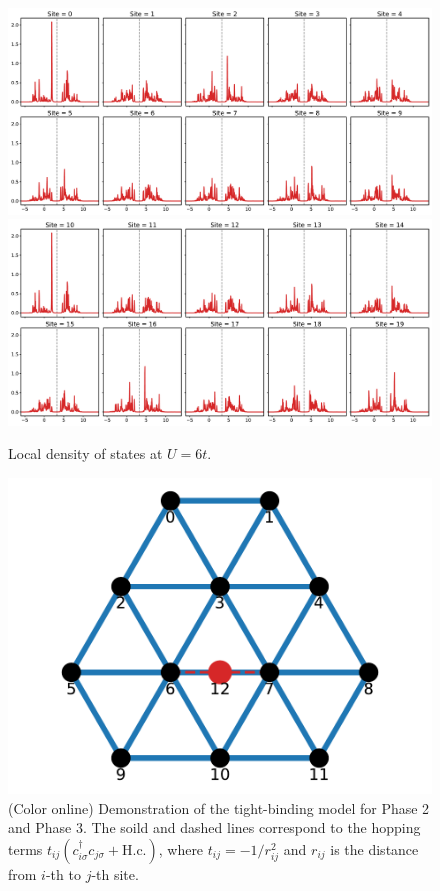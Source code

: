 \documentclass[aps,prb,reprint,amsfonts,amsmath,amssymb,showpacs,groupedaddress,superscriptaddress,onecolumn]{revtex4-1}
\begin{document}
\begin{figure}[p]
    \centering
    \includegraphics[width=0.8\columnwidth]{CPTForPhase1LDOS0.pdf}
    \includegraphics[width=0.8\columnwidth]{CPTForPhase1LDOS1.pdf}
    \caption{\label{fig:CPTForPhase1LDOS} Local density of states at $U = 6t$.}
\end{figure}

\begin{figure}[p]
    \includegraphics[width=0.8\columnwidth]{ModelForPhase2andPhase3.pdf}
    \caption{\label{fig:ModelForPhase2andPhase3} (Color online) Demonstration of the tight-binding model for Phase 2 and Phase 3. The soild and dashed lines correspond to the hopping terms $t_{ij} (c_{i\sigma}^{\dagger} c_{j\sigma} + \text{H.c.})$, where $t_{ij} = -1/r_{ij}^{2}$ and $r_{ij}$ is the distance from $i$-th to $j$-th site.}
\end{figure}
\end{document}
